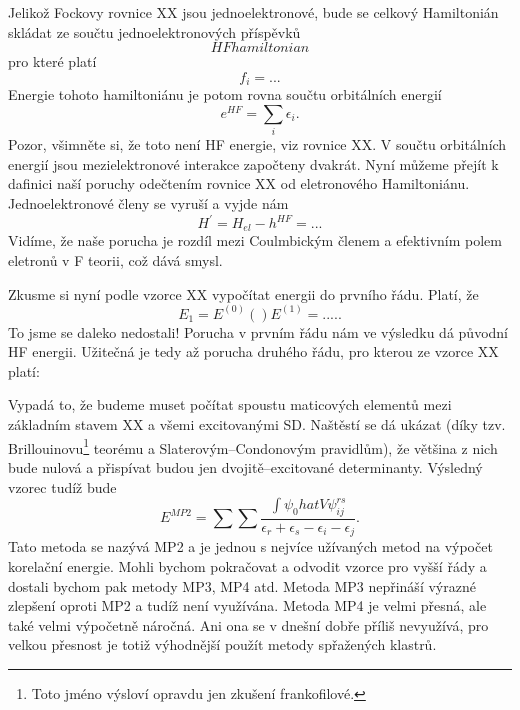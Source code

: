 Jelikož Fockovy rovnice XX jsou jednoelektronové, bude se celkový Hamiltonián skládat ze součtu jednoelektronových příspěvků
\begin{equation}
HF hamiltonian
\end{equation}
pro které platí
\begin{equation}
f_i= ...
\end{equation}
Energie tohoto hamiltoniánu je potom rovna součtu orbitálních energií
\begin{equation}
e^{HF}=\sum_i \epsilon_i .
\end{equation}
Pozor, všimněte si, že toto není HF energie, viz rovnice XX. V součtu orbitálních energií jsou mezielektronové interakce započteny dvakrát. Nyní můžeme přejít k dafinici naší poruchy odečtením rovnice XX od eletronového Hamiltoniánu. Jednoelektronové členy se vyruší a vyjde nám
\begin{equation}
H^{\prime}=H_{el}-h^{HF}= ...
\end{equation}
Vidíme, že naše porucha je rozdíl mezi Coulmbickým členem a efektivním polem eletronů v F teorii, což dává smysl.

Zkusme si nyní podle vzorce XX vypočítat energii do prvního řádu. Platí, že
\begin{equation}
E_1=E^{(0)}()E^{(1)}=.....
\end{equation}
To jsme se daleko nedostali! Porucha v prvním řádu nám ve výsledku dá původní HF energii.
Užitečná je tedy až porucha druhého řádu, pro kterou ze vzorce XX platí:

Vypadá to, že budeme muset počítat spoustu maticových elementů mezi základním stavem XX a všemi excitovanými SD. Naštěstí se dá ukázat (díky tzv. Brillouinovu\footnote{Toto jméno výsloví opravdu jen zkušení frankofilové.} teorému a Slaterovým--Condonovým pravidlům), že většina z nich bude nulová a přispívat budou jen dvojitě--excitované determinanty. Výsledný vzorec tudíž bude
\begin{equation}
E^{MP2}=\sum \sum \frac{\int \psi_0 hat{V} \psi_{ij}^{rs}}{\epsilon_r+\epsilon_s-\epsilon_i-\epsilon_j} .
\end{equation}
Tato metoda se nazývá MP2 a je jednou s nejvíce užívaných metod na výpočet korelační energie.
Mohli bychom pokračovat a odvodit vzorce pro vyšší řády a dostali bychom pak metody MP3, MP4 atd. 
Metoda MP3 nepřináší výrazné zlepšení oproti MP2 a tudíž není využívána. Metoda MP4 je velmi přesná, ale také velmi výpočetně náročná. Ani ona se v dnešní dobře příliš nevyužívá, pro velkou přesnost je totiž výhodnější použít metody spřažených klastrů.

